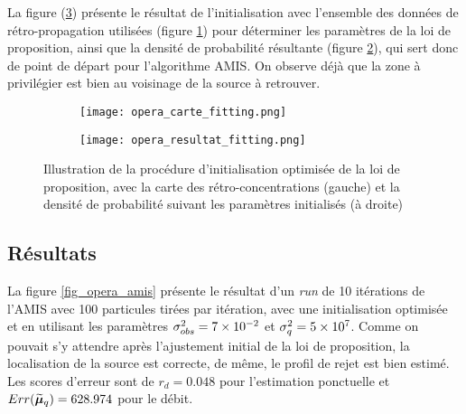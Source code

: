 La figure (\ref{fig_opera_fitting}) présente le résultat de l'initialisation avec l'ensemble des données de rétro-propagation utilisées (figure \ref{opera_carte_fitting}) pour déterminer les paramètres de la loi de proposition, ainsi que la densité de probabilité résultante  (figure \ref{opera_resultat_fitting}), qui sert donc de point de départ pour l'algorithme AMIS. On observe déjà que la zone à privilégier est bien au voisinage de la source à retrouver.\\

\begin{figure}[h!]
	\centering
	\begin{subfigure}[t]{0.5\textwidth}
		\centering
		\texttt{[image: opera\_carte\_fitting.png]}
		\caption{}
		\label{opera_carte_fitting}
	\end{subfigure}%
	\begin{subfigure}[t]{0.5\textwidth}
		\centering
		\texttt{[image: opera\_resultat\_fitting.png]}
		\caption{}
		\label{opera_resultat_fitting}
	\end{subfigure}
	\caption{Illustration de la procédure d'initialisation optimisée de la loi de proposition, avec la carte des rétro-concentrations (gauche) et la densité de probabilité suivant les paramètres initialisés (à droite)}
	\label{fig_opera_fitting}
	
\end{figure}

\subsection{Résultats}

La figure \ref{fig_opera_amis} présente le résultat d'un \textit{run} de 10 itérations de l'AMIS avec 100 particules tirées par itération, avec une initialisation optimisée et en utilisant les paramètres ${\sigma_{obs}^2} = 7 \times 10^{-2}$ et $\sigma_q^2 = 5\times 10^7$. Comme on pouvait s'y attendre après l'ajustement initial de la loi de proposition, la localisation de la source est correcte, de même, le profil de rejet est bien estimé. Les scores d'erreur sont de $r_d = 0.048$ pour l'estimation ponctuelle et $Err(\widetilde{{\bm{\mu}}}_q) = 628.974$ pour le débit.


